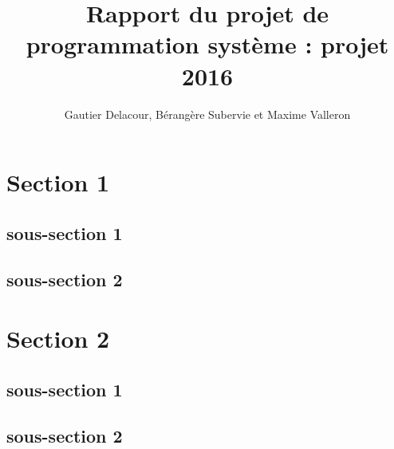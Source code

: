 \documentclass[12pt]{article}
\title{Rapport du projet de programmation système : projet 2016}
\author{Gautier Delacour, Bérangère Subervie et Maxime Valleron}
\date{}
\begin{document}
\maketitle

\tableofcontents

\section{Section 1}

\subsection{sous-section 1}

\subsection{sous-section 2} 

\section{Section 2}

\subsection{sous-section 1}

\subsection{sous-section 2} 
\end{document}
